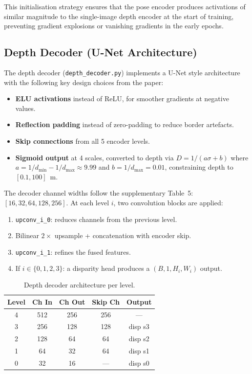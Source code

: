 \documentclass[10pt, a4paper, twocolumn]{article}
\begin{document}
This initialisation strategy ensures that the pose encoder produces activations of similar magnitude to the single-image depth encoder at the start of training, preventing gradient explosions or vanishing gradients in the early epochs.

\subsection{Depth Decoder (U-Net Architecture)}

The depth decoder (\texttt{depth\_decoder.py}) implements a U-Net style architecture with the following key design choices from the paper:

\begin{itemize}[noitemsep]
    \item \textbf{ELU activations} instead of ReLU, for smoother gradients at negative values.
    \item \textbf{Reflection padding} instead of zero-padding to reduce border artefacts.
    \item \textbf{Skip connections} from all 5 encoder levels.
    \item \textbf{Sigmoid output} at 4 scales, converted to depth via $D = 1/(a\sigma + b)$ where $a = 1/d_{\min} - 1/d_{\max} \approx 9.99$ and $b = 1/d_{\max} = 0.01$, constraining depth to $[0.1, 100]$~m.
\end{itemize}

The decoder channel widths follow the supplementary Table~5: $[16, 32, 64, 128, 256]$. At each level $i$, two convolution blocks are applied:

\begin{enumerate}[noitemsep]
    \item \texttt{upconv\_i\_0}: reduces channels from the previous level.
    \item Bilinear $2\times$ upsample + concatenation with encoder skip.
    \item \texttt{upconv\_i\_1}: refines the fused features.
    \item If $i \in \{0,1,2,3\}$: a disparity head produces a $(B, 1, H_i, W_i)$ output.
\end{enumerate}

\begin{table}[H]
\centering
\caption{Depth decoder architecture per level.}
\label{tab:decoder}
\begin{tabular}{@{}ccccc@{}}
\toprule
\textbf{Level} & \textbf{Ch In} & \textbf{Ch Out} & \textbf{Skip Ch} & \textbf{Output} \\
\midrule
4 & 512 & 256 & 256 & --- \\
3 & 256 & 128 & 128 & disp s3 \\
2 & 128 & 64  & 64  & disp s2 \\
1 & 64  & 32  & 64  & disp s1 \\
0 & 32  & 16  & --- & disp s0 \\
\bottomrule
\end{tabular}
\end{table}
\end{document}
